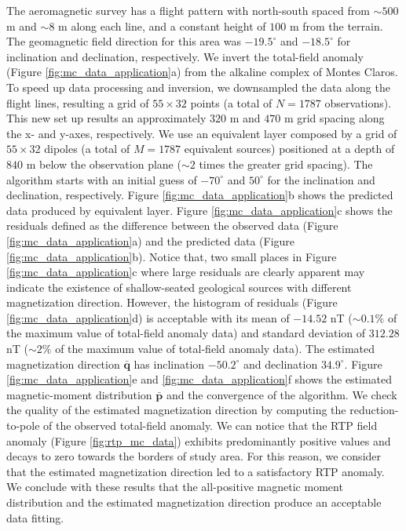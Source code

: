 The aeromagnetic survey has a flight pattern with north-south spaced from $\sim 500$ m and $ \sim 8$ m along each line, and a constant height of $100$ m from the terrain. The geomagnetic field direction for this area was $-19.5^\circ$ and $-18.5^\circ$ for inclination and declination, respectively. We invert the total-field anomaly (Figure \ref{fig:mc_data_application}a) from the alkaline complex of Montes Claros. To speed up data processing and inversion, we downsampled the data along the flight lines, resulting a grid of $55 \times 32$ points (a total of $N=1787$ observations). This new set up results an approximately $320$ m and $470$ m grid spacing along the x- and y-axes, respectively. We use an equivalent layer composed by a grid of $55 \times 32$ dipoles (a total of $M=1787$ equivalent sources) positioned at a depth of $840$ m below the observation plane ($\sim 2$ times the greater grid spacing). The algorithm starts with an initial guess of $-70^\circ$ and $50^\circ$ for the inclination and declination, respectively. Figure \ref{fig:mc_data_application}b shows the predicted data produced by equivalent layer. Figure \ref{fig:mc_data_application}c shows the residuals defined as the difference between the observed data (Figure \ref{fig:mc_data_application}a) and the predicted data (Figure \ref{fig:mc_data_application}b). Notice that, two small places in Figure \ref{fig:mc_data_application}c where large residuals are clearly apparent may indicate the existence of shallow-seated geological sources with different magnetization direction. However, the histogram of residuals (Figure \ref{fig:mc_data_application}d) is acceptable with its mean of $-14.52$ nT ($\sim 0.1\% $ of the maximum value of total-field anomaly data) and standard deviation of $312.28$ nT ($\sim 2 \% $ of the maximum value of total-field anomaly data). The estimated magnetization direction $\bar{\mathbf{q}}$ has inclination $-50.2^\circ$ and declination $34.9^\circ$. Figure \ref{fig:mc_data_application}e and \ref{fig:mc_data_application}f shows the estimated magnetic-moment distribution $\bar{\mathbf{p}}$ and the convergence of the algorithm. We check the quality of the estimated magnetization direction by computing the reduction-to-pole of the observed total-field anomaly. We can notice that the RTP field anomaly (Figure \ref{fig:rtp_mc_data}) exhibits predominantly positive values and decays to zero towards the borders of study area. For this reason, we consider that the estimated magnetization direction led to a satisfactory RTP anomaly. We conclude with these results that the all-positive magnetic moment distribution and the estimated magnetization direction produce an acceptable data fitting. 
